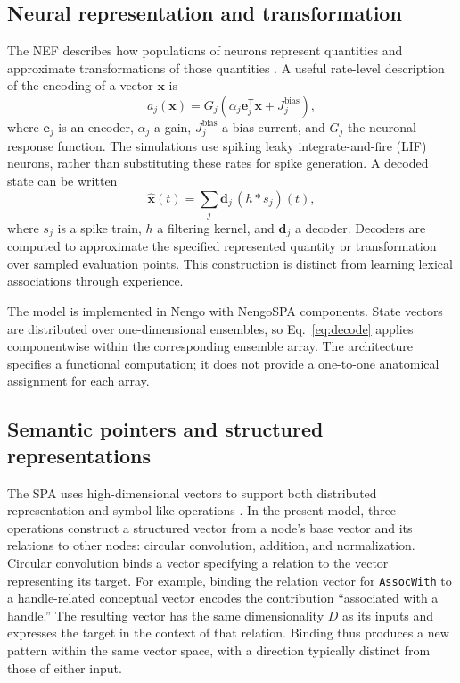 \subsection{Neural representation and transformation}
The NEF describes how populations of neurons represent quantities and approximate transformations of those quantities \citep{eliasmith2003}. A useful rate-level description of the encoding of a vector $\mathbf x$ is
\begin{equation}
 a_j(\mathbf x)=G_j\!\left(\alpha_j\mathbf e_j^{\mathsf T}\mathbf x+J_j^{\mathrm{bias}}\right),
\end{equation}
where $\mathbf e_j$ is an encoder, $\alpha_j$ a gain, $J_j^{\mathrm{bias}}$ a bias current, and $G_j$ the neuronal response function. The simulations use spiking leaky integrate-and-fire (LIF) neurons, rather than substituting these rates for spike generation. A decoded state can be written
\begin{equation}
 \hat{\mathbf x}(t)=\sum_j\mathbf d_j\,(h*s_j)(t),
 \label{eq:decode}
\end{equation}
where $s_j$ is a spike train, $h$ a filtering kernel, and $\mathbf d_j$ a decoder. Decoders are computed to approximate the specified represented quantity or transformation over sampled evaluation points. This construction is distinct from learning lexical associations through experience.

The model is implemented in Nengo \citep{bekolay2014} with NengoSPA components. State vectors are distributed over one-dimensional ensembles, so Eq.~\eqref{eq:decode} applies componentwise within the corresponding ensemble array. The architecture specifies a functional computation; it does not provide a one-to-one anatomical assignment for each array.

\subsection{Semantic pointers and structured representations}
The SPA uses high-dimensional vectors to support both distributed representation and symbol-like operations \citep{eliasmith2013}. In the present model, three operations construct a structured vector from a node's base vector and its relations to other nodes: circular convolution, addition, and normalization. Circular convolution binds a vector specifying a relation to the vector representing its target. For example, binding the relation vector for \texttt{AssocWith} to a handle-related conceptual vector encodes the contribution ``associated with a handle.'' The resulting vector has the same dimensionality $D$ as its inputs and expresses the target in the context of that relation. Binding thus produces a new pattern within the same vector space, with a direction typically distinct from those of either input.

